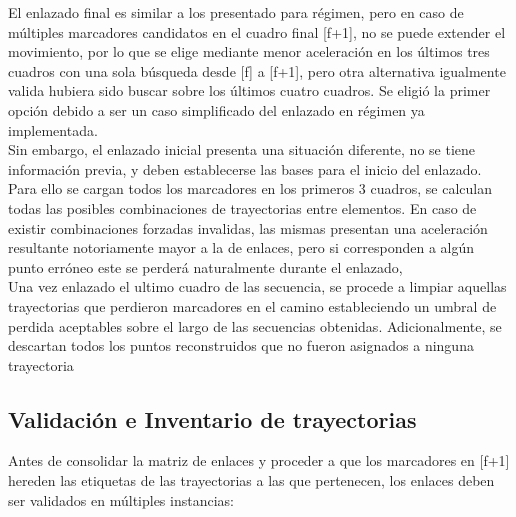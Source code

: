 El enlazado final es similar a los presentado para régimen, pero en caso de múltiples marcadores candidatos en el cuadro final [f+1], no se puede extender el movimiento, por lo que se elige mediante menor aceleración en los últimos tres cuadros con una sola búsqueda desde [f] a [f+1], pero otra alternativa igualmente valida hubiera sido buscar sobre los últimos cuatro cuadros. Se eligió la primer opción debido a  ser un caso simplificado del enlazado en régimen ya implementada. 
\\ 

Sin embargo, el enlazado inicial presenta una situación diferente, no se tiene información previa, y deben establecerse las bases para el inicio del enlazado. Para ello se cargan todos los marcadores en los primeros 3 cuadros, se calculan todas las posibles combinaciones de trayectorias entre elementos. En caso de existir combinaciones forzadas invalidas, las mismas presentan una aceleración resultante notoriamente mayor a la de enlaces, pero si corresponden a algún punto erróneo este se perderá naturalmente durante el enlazado,
\\ 

Una vez enlazado el ultimo cuadro de las secuencia, se procede a limpiar aquellas trayectorias que perdieron marcadores en el camino estableciendo un umbral de perdida aceptables sobre el largo de las secuencias obtenidas. Adicionalmente, se descartan todos los puntos reconstruidos que no fueron asignados a ninguna trayectoria 


\subsection{Validación e Inventario de trayectorias}

Antes de consolidar la matriz de enlaces y proceder a que los marcadores en [f+1] hereden las etiquetas de las trayectorias a las que pertenecen, los enlaces deben ser validados en múltiples instancias:

